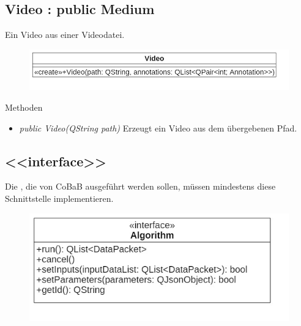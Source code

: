 \subsection*{Video : public Medium}
Ein Video aus einer Videodatei.

\begin{figure}[H]
\centering
\includegraphics[scale=0.5]{img/Klassendiagramm/Klassen/Model/Video}
\label{fig:video}
\end{figure}

Methoden
\begin{itemize}
\item \textit{public Video(QString path)} Erzeugt ein Video aus dem übergebenen Pfad.
\end{itemize}

\subsection*{<<interface>> }
Die , die von CoBaB ausgeführt werden sollen, müssen mindestens diese Schnittstelle implementieren.

\begin{figure}[H]
\centering
\includegraphics[scale=0.5]{img/Klassendiagramm/Klassen/Model/Algorithm}
\label{fig:algorithm}
\end{figure}

